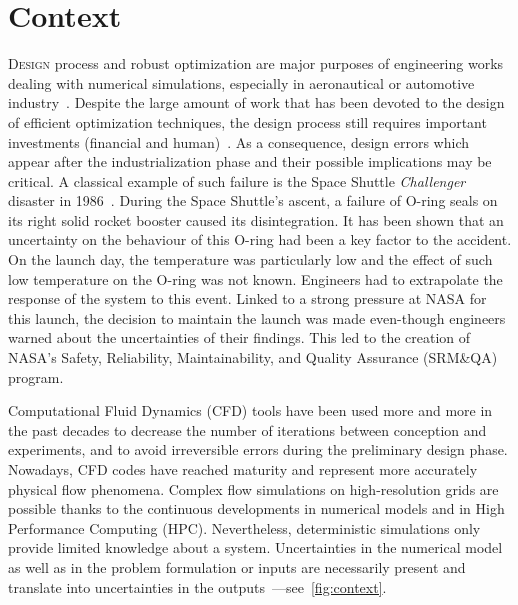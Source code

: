 \chapter{Context}

\lettrine{D}{esign} process and robust optimization are major purposes of engineering works dealing with numerical simulations, especially in aeronautical or automotive industry~\cite{duchaine2009}. Despite the large amount of work that has been devoted to the design of efficient optimization techniques, the design process still requires important investments (financial and human)~\cite{forrester2009}. As a consequence, design errors which appear after the industrialization phase and their possible implications may be critical. A classical example of such failure is the Space Shuttle \emph{Challenger} disaster in 1986~\cite{draper1995}. During the Space Shuttle's ascent, a failure of O-ring seals on its right solid rocket booster caused its disintegration. It has been shown that an uncertainty on the behaviour of this O-ring had been a key factor to the accident. On the launch day, the temperature was particularly low and the effect of such low temperature on the O-ring was not known. Engineers had to extrapolate the response of the system to this event. Linked to a strong pressure at NASA for this launch, the decision to maintain the launch was made even-though engineers warned about the uncertainties of their findings. This led to the creation of NASA's Safety, Reliability, Maintainability, and Quality Assurance (SRM\&QA) program.

Computational Fluid Dynamics (CFD) tools have been used more and more in the past decades to decrease the number of iterations between conception and experiments, and to avoid irreversible errors during the preliminary design phase. Nowadays, CFD codes have reached maturity and represent more accurately physical flow phenomena. Complex flow simulations on high-resolution grids are possible thanks to the continuous developments in numerical models and in High Performance Computing (HPC). Nevertheless, deterministic simulations only provide limited knowledge about a system. Uncertainties in the numerical model as well as in the problem formulation or inputs are necessarily present and translate into uncertainties in the outputs~\cite{Sacks1989}---see~\cref{fig:context}.

